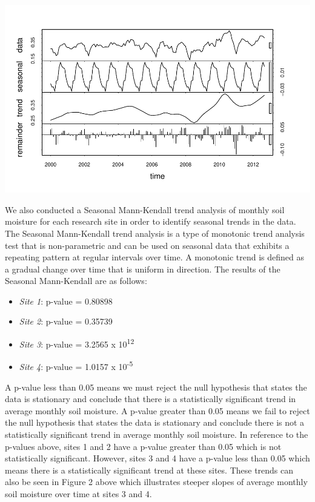 \documentclass[
  12pt,
]{article}
\providecommand{\tightlist}{%
  \setlength{\itemsep}{0pt}\setlength{\parskip}{0pt}}
\begin{document}
\includegraphics{Project_Report_Davidson_McClaugherty_Zungailia_files/figure-latex/TSA-4.pdf}

We also conducted a Seasonal Mann-Kendall trend analysis of monthly soil
moisture for each research site in order to identify seasonal trends in
the data. The Seasonal Mann-Kendall trend analysis is a type of
monotonic trend analysis test that is non-parametric and can be used on
seasonal data that exhibits a repeating pattern at regular intervals
over time. A monotonic trend is defined as a gradual change over time
that is uniform in direction. The results of the Seasonal Mann-Kendall
are as follows:

\begin{itemize}
\tightlist
\item
  \emph{Site 1}: p-value = 0.80898
\item
  \emph{Site 2}: p-value = 0.35739
\item
  \emph{Site 3}: p-value = 3.2565 x 10\textsuperscript{12}
\item
  \emph{Site 4}: p-value = 1.0157 x 10\textsuperscript{-5}
\end{itemize}

A p-value less than 0.05 means we must reject the null hypothesis that
states the data is stationary and conclude that there is a statistically
significant trend in average monthly soil moisture. A p-value greater
than 0.05 means we fail to reject the null hypothesis that states the
data is stationary and conclude there is not a statistically significant
trend in average monthly soil moisture. In reference to the p-values
above, sites 1 and 2 have a p-value greater than 0.05 which is not
statistically significant. However, sites 3 and 4 have a p-value less
than 0.05 which means there is a statistically significant trend at
these sites. These trends can also be seen in Figure 2 above which
illustrates steeper slopes of average monthly soil moisture over time at
sites 3 and 4.
\end{document}
